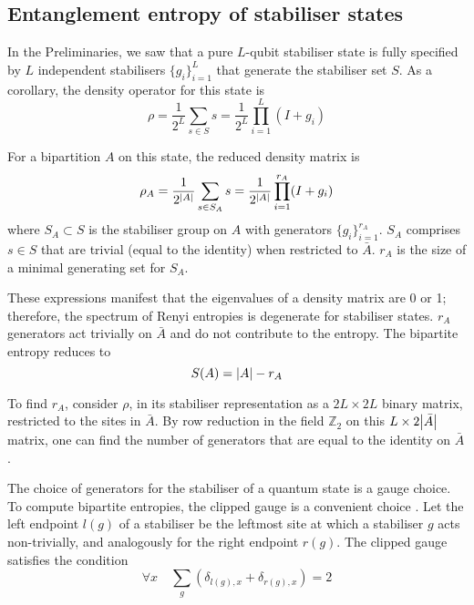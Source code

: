 \documentclass[10pt]{article}
\begin{document}
\begin{appendices}
\begin{comment}
\end{comment}





\section{Entanglement entropy of stabiliser states}

In the Preliminaries, we saw that a pure $L$-qubit stabiliser state is fully specified by $L$ independent stabilisers $\{g_i\}_{i=1}^L$ that generate the stabiliser set $S$. As a corollary, the density operator for this state is
\begin{equation}
\rho = \frac{1}{2^L} \sum_{s \in S} s = \frac{1}{2^L} \prod_{i=1}^L (I + g_i)
\end{equation}


For a bipartition $A$ on this state, the reduced density matrix is
\begin{equation}
\rho_A 
= \frac{1}{2^{\abs{A}}} \sum_{s \in S_A} s 
= \frac{1}{2^{\abs{A}}} \prod_{i=1}^{r_A} (I + g_i)
\end{equation}
where $S_A \subset S$ is the stabiliser group on $A$ with generators $\{g_i\}_{i=1}^{r_A}$. $S_A$ comprises $s \in S$ that are trivial (equal to the identity) when restricted to $\bar{A}$. $r_A$ is the size of a minimal generating set for $S_A$.

These expressions manifest that the eigenvalues of a density matrix are 0 or 1; therefore, the spectrum of Renyi entropies is degenerate for stabiliser states. $r_A$ generators act trivially on $\bar{A}$ and do not contribute to the entropy. The bipartite entropy reduces to \cite{li2019measurement, gullans2019dynamical}
\begin{equation}
S(A) = \abs{A} - r_A
\end{equation}

To find $r_A$, consider $\rho$, in its stabiliser representation as a $2L\times2L$ binary matrix, restricted to the sites in $\bar{A}$. By row reduction in the field $\mathbb{Z}_2$ on this $L \times 2\abs{\bar{A}}$ matrix, one can find the number of generators that are equal to the identity on $\bar{A}$.

The choice of generators for the stabiliser of a quantum state is a gauge choice. To compute bipartite entropies, the clipped gauge is a convenient choice \cite{li2019measurement, nahum2017quantum, gullans2019dynamical}. Let the left endpoint $l(g)$ of a stabiliser be the leftmost site at which a stabiliser $g$ acts non-trivially, and analogously for the right endpoint $r(g)$. The clipped gauge satisfies the condition
\begin{equation}
\forall x \quad \sum_g \left(\delta_{l(g),x} + \delta_{r(g),x} \right) = 2
\end{equation}


\end{appendices}
\end{document}
